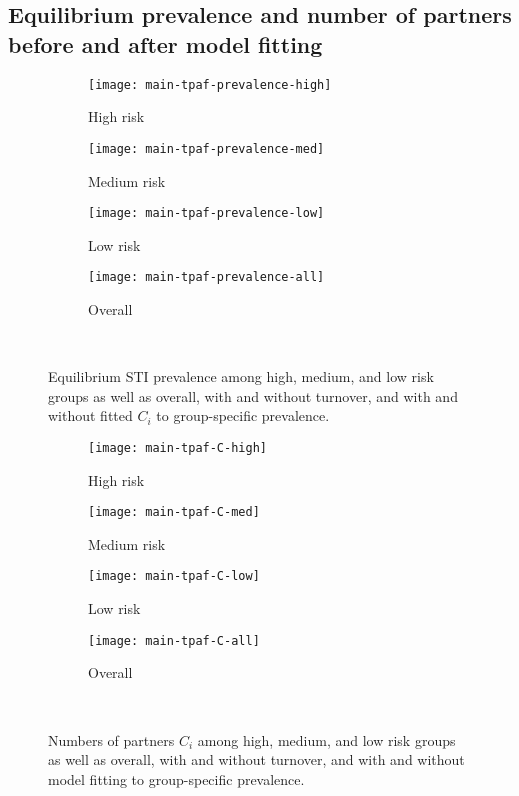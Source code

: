 \subsection{Equilibrium prevalence and number of partners before and after model fitting}
\begin{figure}[H]
  \begingroup\centering
  \begin{subfigure}{0.4\linewidth}
    \texttt{[image: main-tpaf-prevalence-high]}
    \caption{High risk}
    \label{fig:tpaf-prevalence-high}
  \end{subfigure}
  \begin{subfigure}{0.4\linewidth}
    \centering\texttt{[image: main-tpaf-prevalence-med]}
    \caption{Medium risk}
    \label{fig:tpaf-prevalence-med}
  \end{subfigure}
  \begin{subfigure}{0.4\linewidth}
    \texttt{[image: main-tpaf-prevalence-low]}
    \caption{Low risk}
    \label{fig:tpaf-prevalence-low}
  \end{subfigure}
  \begin{subfigure}{0.4\linewidth}
    \texttt{[image: main-tpaf-prevalence-all]}
    \caption{Overall}
    \label{fig:tpaf-prevalence-all}
  \end{subfigure}
  \\\endgroup
  \caption{Equilibrium STI prevalence
    among high, medium, and low risk groups as well as overall,
    with and without turnover,
    and with and without fitted $C_i$ to group-specific prevalence.}
  \label{fig:tpaf-prevalence}
\end{figure}
\begin{figure}[H]
  \begingroup\centering
  \begin{subfigure}{0.4\linewidth}
    \texttt{[image: main-tpaf-C-high]}
    \caption{High risk}
    \label{fig:tpaf-C-high}
  \end{subfigure}
  \begin{subfigure}{0.4\linewidth}
    \texttt{[image: main-tpaf-C-med]}
    \caption{Medium risk}
    \label{fig:tpaf-C-med}
  \end{subfigure}
  \begin{subfigure}{0.4\linewidth}
    \texttt{[image: main-tpaf-C-low]}
    \caption{Low risk}
    \label{fig:tpaf-C-low}
  \end{subfigure}
  \begin{subfigure}{0.4\linewidth}
    \texttt{[image: main-tpaf-C-all]}
    \caption{Overall}
    \label{fig:tpaf-C-all}
  \end{subfigure}
  \\\endgroup
  \caption{Numbers of partners $C_i$
    among high, medium, and low risk groups as well as overall,
    with and without turnover,
    and with and without model fitting to group-specific prevalence.}
  \label{fig:tpaf-C}
\end{figure}
